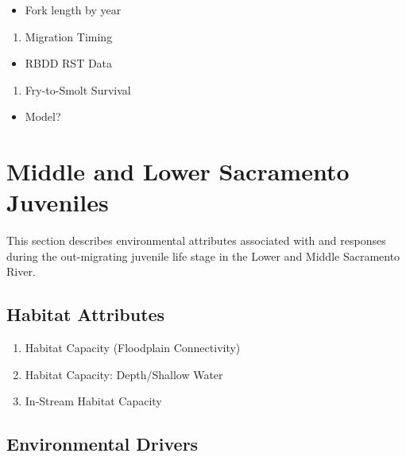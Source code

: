 \documentclass[
]{book}
\providecommand{\tightlist}{%
  \setlength{\itemsep}{0pt}\setlength{\parskip}{0pt}}
\theoremstyle{definition}
\theoremstyle{definition}
\theoremstyle{definition}
\theoremstyle{definition}
\theoremstyle{remark}
\begin{document}
\begin{itemize}
\tightlist
\item
  Fork length by year
\end{itemize}

\begin{enumerate}
\def\labelenumi{\arabic{enumi}.}
\setcounter{enumi}{2}
\tightlist
\item
  Migration Timing
\end{enumerate}

\begin{itemize}
\tightlist
\item
  RBDD RST Data
\end{itemize}

\begin{enumerate}
\def\labelenumi{\arabic{enumi}.}
\setcounter{enumi}{3}
\tightlist
\item
  Fry-to-Smolt Survival
\end{enumerate}

\begin{itemize}
\tightlist
\item
  Model?
\end{itemize}

\hypertarget{middle-and-lower-sacramento-juveniles}{%
\chapter{Middle and Lower Sacramento Juveniles}\label{middle-and-lower-sacramento-juveniles}}

This section describes environmental attributes associated with and responses during the out-migrating juvenile life stage in the Lower and Middle Sacramento River.

\hypertarget{habitat-attributes-3}{%
\section{Habitat Attributes}\label{habitat-attributes-3}}

\begin{enumerate}
\def\labelenumi{\arabic{enumi}.}
\item
  Habitat Capacity (Floodplain Connectivity)
\item
  Habitat Capacity: Depth/Shallow Water
\item
  In-Stream Habitat Capacity
\end{enumerate}

\hypertarget{environmental-drivers-2}{%
\section{Environmental Drivers}\label{environmental-drivers-2}}
\end{document}
